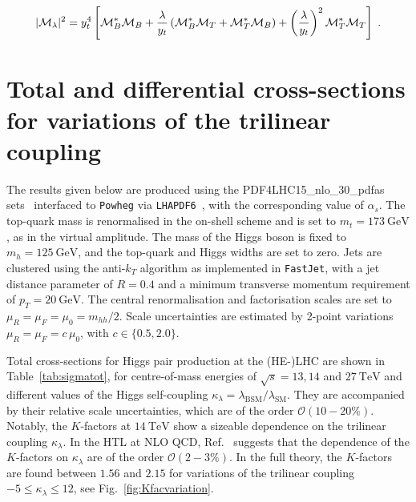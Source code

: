 \documentclass[a4paper]{jpconf}
\newcommand{\GeV}{\ensuremath{\mathrm{\:GeV}}}
\newcommand{\TeV}{\ensuremath{\mathrm{\:TeV}}}
\newcommand{\chhh}{\ensuremath{\kappa_{\lambda}}}
\begin{document}
\begin{equation}
|{\cal M}_\lambda|^2=y_t^4 \left[ \mathcal{M}_B^* \mathcal{M}_B + \frac{\lambda}{y_t} \left( \mathcal{M}_B^* \mathcal{M}_T + \mathcal{M}_T^* \mathcal{M}_B  \right) +  \left( \frac{\lambda}{y_t} \right)^2 \mathcal{M}_T^* \mathcal{M}_T \right] \;.
\end{equation}



\section{Total and differential cross-sections for variations of the trilinear coupling}

The results given below are produced using the PDF4LHC15\_nlo\_30\_pdfas sets~\cite{Butterworth:2015oua,CT14,MMHT14,NNPDF} interfaced to \texttt{Powheg} via \texttt{LHAPDF6}~\cite{Buckley:2014ana}, with the corresponding value of $\alpha_s$. The top-quark mass is renormalised in the on-shell scheme and is set to $m_t=173 \GeV$, as in the virtual amplitude. The mass of the Higgs boson is fixed to $m_h=125 \GeV$, and the top-quark and Higgs widths are set to zero. Jets are clustered using the anti-$k_T$ algorithm as implemented in \texttt{FastJet}, with a jet distance parameter of $R=0.4$ and a minimum transverse momentum requirement of $p_{T} = 20 \GeV$. The central renormalisation and factorisation scales are set to $\mu_R = \mu_F = \mu_0 = m_{hh} / 2$. Scale uncertainties are estimated by 2-point variations $\mu_R = \mu_F = c\, \mu_0$, with $c \in \lbrace {0.5, 2.0} \rbrace$.

Total cross-sections for Higgs pair production at the (HE-)LHC are shown in Table~\ref{tab:sigmatot}, for centre-of-mass energies of $\sqrt{s}=13,14$ and $27 \TeV$ and different values of the Higgs self-coupling $\chhh = \lambda_{\mathrm{BSM}} / \lambda_{\mathrm{SM}}$. They are accompanied by their relative scale uncertainties, which are of the order $\mathcal{O}(10-20\%)$. Notably, the $K$-factors at $14 \TeV$ show a sizeable dependence on the trilinear coupling $\chhh$. In the HTL at NLO QCD, Ref.~\cite{Grober:2015cwa} suggests that the dependence of the $K$-factors on $\chhh$ are of the order $\mathcal{O}(2-3\%)$. In the full theory, the $K$-factors are found between $1.56$ and $2.15$ for variations of the trilinear coupling $-5 \leq \chhh \leq 12$, see Fig.~\ref{fig:Kfacvariation}. 
\end{document}
